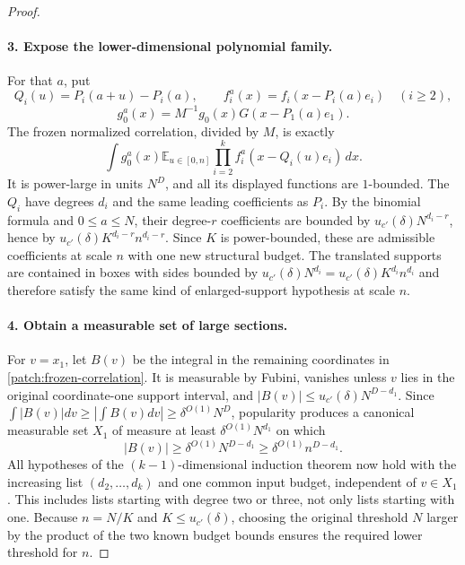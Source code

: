 \documentclass[11pt]{article}
\theoremstyle{definition}
\begin{document}
\begin{proof}
\paragraph{3. Expose the lower-dimensional polynomial family.}
For that $a$, put
\[
 Q_i(u)=P_i(a+u)-P_i(a),\qquad
 f_i^a(x)=f_i(x-P_i(a)e_i)\quad(i\geq2),
\]
\[
 g_0^a(x)=M^{-1}g_0(x)G(x-P_1(a)e_1).
\]
The frozen normalized correlation, divided by $M$, is exactly
\begin{equation}\label{patch:frozen-correlation}
 \int g_0^a(x)\mathbb E_{u\in[0,n]}
               \prod_{i=2}^k f_i^a(x-Q_i(u)e_i)\,dx.
\end{equation}
It is power-large in units $N^D$, and all its displayed functions are $1$-bounded.
The $Q_i$ have degrees $d_i$ and the same leading coefficients as $P_i$.
By the binomial formula and $0\leq a\leq N$, their degree-$r$ coefficients are bounded by
$u_{c'}(\delta)N^{d_i-r}$, hence by
$u_{c'}(\delta)K^{d_i-r}n^{d_i-r}$.
Since $K$ is power-bounded, these are admissible coefficients at scale $n$ with one new
structural budget.  The translated supports are contained in boxes with sides bounded by
$u_{c'}(\delta)N^{d_i}=u_{c'}(\delta)K^{d_i}n^{d_i}$ and therefore satisfy the same kind
of enlarged-support hypothesis at scale $n$.

\paragraph{4. Obtain a measurable set of large sections.}
For $v=x_1$, let $B(v)$ be the integral in the remaining coordinates in
\eqref{patch:frozen-correlation}.  It is measurable by Fubini, vanishes unless $v$ lies in
the original coordinate-one support interval, and
$|B(v)|\leq u_{c'}(\delta)N^{D-d_1}$.
Since $\int|B(v)|dv\geq|\int B(v)dv|\geq\delta^{O(1)}N^D$, popularity produces a
canonical measurable set $X_1$ of measure at least $\delta^{O(1)}N^{d_1}$ on which
\[
 |B(v)|\geq\delta^{O(1)}N^{D-d_1}\geq\delta^{O(1)}n^{D-d_1}.
\]
All hypotheses of the $(k-1)$-dimensional induction theorem now hold with the increasing
list $(d_2,\ldots,d_k)$ and one common input budget, independent of $v\in X_1$.
This includes lists starting with degree two or three, not only lists starting with one.
Because $n=N/K$ and $K\leq u_{c'}(\delta)$, choosing the original threshold $N$ larger
by the product of the two known budget bounds ensures the required lower threshold for $n$.


\end{proof}
\end{document}
